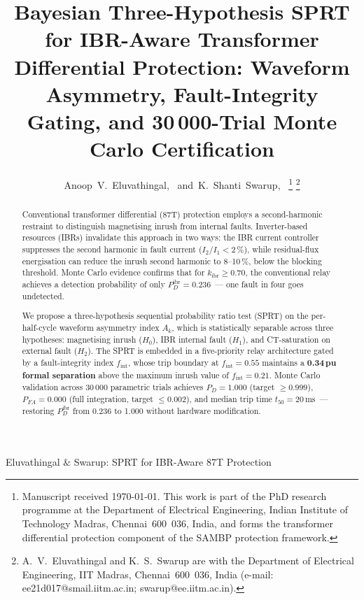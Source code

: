 \documentclass[journal,twoside,10pt]{IEEEtran}
\newcommand{\kibr}{k_{\mathrm{ibr}}}
\newcommand{\ms}{\,\text{ms}}
\newcommand{\fint}{f_{\mathrm{int}}}
\newcommand{\Ak}{A_k}
\newcommand{\Pdibr}{P_D^{\mathrm{ibr}}}
\begin{document}

\title{Bayesian Three-Hypothesis SPRT for IBR-Aware Transformer Differential
       Protection: Waveform Asymmetry, Fault-Integrity Gating, and
       30\,000-Trial Monte Carlo Certification}

\author{Anoop~V.~Eluvathingal,~
        and~K.~Shanti~Swarup,~%
\thanks{Manuscript received \today.
        This work is part of the PhD research programme at the
        Department of Electrical Engineering, Indian Institute of
        Technology Madras, Chennai~600~036, India, and forms the
        transformer differential protection component of the SAMBP
        protection framework.}%
\thanks{A.~V.~Eluvathingal and K.~S.~Swarup are with the Department of
        Electrical Engineering, IIT Madras, Chennai~600~036, India
        (e-mail: ee21d017@smail.iitm.ac.in; swarup@ee.iitm.ac.in).}}

%
{Eluvathingal \& Swarup: SPRT for IBR-Aware 87T Protection}

\maketitle

\begin{abstract}
Conventional transformer differential (87T) protection employs a
second-harmonic restraint to distinguish magnetising inrush from internal
faults.
Inverter-based resources (IBRs) invalidate this approach in two ways:
the IBR current controller suppresses the second harmonic in fault current
($I_2/I_1 < 2\,\%$), while residual-flux energisation can reduce the
inrush second harmonic to 8--10\,\%, below the blocking threshold.
Monte Carlo evidence confirms that for $\kibr \geq 0.70$, the conventional
relay achieves a detection probability of only $\Pdibr = 0.236$~---
one fault in four goes undetected.

We propose a three-hypothesis sequential probability ratio test (SPRT) on
the per-half-cycle waveform asymmetry index $\Ak$, which is statistically
separable across three hypotheses: magnetising inrush ($H_0$), IBR internal
fault ($H_1$), and CT-saturation on external fault ($H_2$).
The SPRT is embedded in a five-priority relay architecture gated by a
fault-integrity index $\fint$, whose trip boundary at $\fint = 0.55$
maintains a \textbf{0.34\,pu formal separation} above the maximum inrush
value of $\fint = 0.21$.
Monte Carlo validation across 30\,000 parametric trials achieves
$P_D = 1.000$ (target $\geq 0.999$), $P_{FA} = 0.000$ (full integration,
target $\leq 0.002$), and median trip time $t_{50} = 20\ms$~---
restoring $\Pdibr$ from 0.236 to 1.000 without hardware modification.
\end{abstract}
\end{document}
